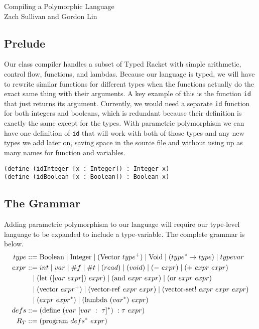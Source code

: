 \documentclass{article}
\begin{document}
\begin{center}
  {\huge Compiling a Polymorphic Language}\\
  \vspace{0.1in}
  Zach Sullivan and Gordon Lin\\
  \hrulefill
  \vspace{0.2in}
\end{center}

\subsection*{Prelude}

Our class compiler handles a subset of Typed Racket with simple arithmetic,
control flow, functions, and lambdas. Because our language is typed, we will
have to rewrite similar functions for different types when the functions
actually do the exact same thing with their arguments. A key example of this
is the function {\tt id} that just returns its argument. Currently, we would
need a separate {\tt id} function for both integers and booleans, which is
redundant because their definition is exactly the same except for the types.
With parametric polymorphism we can have one definition of {\tt id} that will
work with both of those types and any new types we add later on, saving space
in the source file and without using up as many names for function and
variables.
\begin{center}
  {\tt (define (idInteger [x : Integer]) : Integer x)}\\
  {\tt (define (idBoolean [x : Boolean]) : Boolean x)}
\end{center}

\subsection*{The Grammar}

Adding parametric polymorphism to our language will require our type-level
language to be expanded to include a type-variable.
The complete grammar is below.
\begin{align*}
  type &::= {\rm Boolean \mid Integer \mid (Vector}\ type^+) \mid
         {\rm Void} \mid (type^* \to type) \mid type var\\
  expr  &::= int \mid var \mid \#f \mid \#t \mid (read) \mid (void)
          \mid (-\ expr) \mid (+\ expr\ expr)\\
       &\ \ \mid({\rm let}\ ([var\ expr])\ expr) \mid ({\rm and}\ expr\ expr)
         \mid ({\rm or}\ expr\ expr)\\
       &\ \ \mid ({\rm vector}\ expr^+)
         \mid ({\rm vector\textrm{-}ref}\ expr\ expr)
         \mid ({\rm vector\textrm{-}set!}\ expr\ expr\ expr)\\
       &\ \ \mid (expr\ expr^*) \mid ({\rm lambda}\ (var^*)\ expr)\\
  defs  &::= ({\rm define}\ (var\ [var\ :\ \tau]^*)\ : \tau\ expr)\\
  R_{T} &::= {\rm (program\ } defs^*\ expr)
\end{align*}
\end{document}
